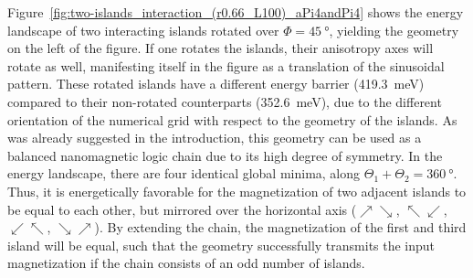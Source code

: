 \documentclass[11pt,a4paper,english]{article}
\begin{document}
Figure~\ref{fig:two-islands_interaction_(r0.66_L100)_aPi4andPi4} shows the energy landscape of two interacting islands rotated over $\Phi=\SI{45}{\degree}$, yielding the geometry on the left of the figure. If one rotates the islands, their anisotropy axes will rotate as well, manifesting itself in the figure as a translation of the sinusoidal pattern. These rotated islands have a different energy barrier (\SI{419.3}{\milli\electronvolt}) compared to their non-rotated counterparts (\SI{352.6}{\milli\electronvolt}), due to the different orientation of the numerical grid with respect to the geometry of the islands. As was already suggested in the introduction, this geometry can be used as a balanced nanomagnetic logic chain due to its high degree of symmetry. In the energy landscape, there are four identical global minima, along $\Theta_1 + \Theta_2 = \SI{360}{\degree}$. Thus, it is energetically favorable for the magnetization of two adjacent islands to be equal to each other, but mirrored over the horizontal axis ($\nearrow \searrow$, $\nwarrow \swarrow$, $\swarrow \nwarrow$, $\searrow \nearrow$). By extending the chain, the magnetization of the first and third island will be equal, such that the geometry successfully transmits the input magnetization if the chain consists of an odd number of islands. 
\end{document}
